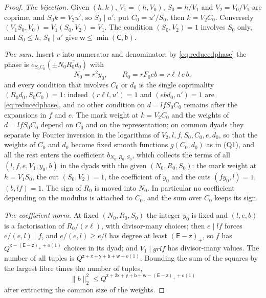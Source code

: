 \documentclass[11pt,colorlinks]{charlie}
\begin{document}
\begin{proof}
\emph{The bijection.} Given $(h,k)$, $V_1=(h,V_0)$, $S_0=h/V_1$ and $V_2=V_0/V_1$ are coprime, and $S_0k=V_2u'$, so $S_0\mid u'$; put $C_0=u'/S_0$, then $k=V_2C_0$. Conversely $(V_1S_0,V_0)=V_1(S_0,V_2)=V_1$. The condition $(S_0,V_2)=1$ involves $S_0$ only, and $S_0\le h$, $S_0\mid u'$ give $\mathsf w\le\min(\mathsf C,\mathfrak b)$.

\emph{The sum.} Insert $r$ into numerator and denominator: by \eqref{eq:reducedphase} the phase is $e_{S_0C_0}(\pm N_0\overline{R_0d_0})$ with
\[
 N_0=r^2y_0,\qquad R_0=rF_0eb=r\ell\,l\,e\,b,
\]
and every condition that involves $C_0$ or $d_0$ is the single coprimality $(R_0d_0,S_0C_0)=1$: indeed $(r\ell l,u')=1$ and $(ebd_0,u')=1$ are \eqref{eq:reducedphase}, and no other condition on $d=lfS_0C_0$ remains after the expansions in $f$ and $e$. The mark weight at $k=V_2C_0$ and the weights of $d=lfS_0C_0$ depend on $C_0$ and on the representation; on common dyads they separate by Fourier inversion in the logarithms of $V_2,l,f,S_0,C_0,e,d_0$, so that the weights of $C_0$ and $d_0$ become fixed smooth functions $g(C_0,d_0)$ as in (Q1), and all the rest enters the coefficient $b_{N_0,R_0,S_0}$, which collects the terms of all $(l,f,e,V_1,y_0,b)$ in the dyads with the given $(N_0,R_0,S_0)$: the mark weight at $h=V_1S_0$, the cut $(S_0,V_2)=1$, the coefficient of $y_0$ and the cuts $(fy_0,l)=1$, $(b,lf)=1$. The sign of $R_0$ is moved into $N_0$. In particular no coefficient depending on the modulus is attached to $C_0$, and the sum over $C_0$ keeps its sign.

\emph{The coefficient norm.} At fixed $(N_0,R_0,S_0)$ the integer $y_0$ is fixed and $(l,e,b)$ is a factorisation of $R_0/(r\ell)$, with divisor-many choices; then $e\mid lf$ forces $e/(e,l)\mid f$, and $e/(e,l)\ge e/l$ has degree at least $(\mathsf E-\mathsf z)_+$, so $f$ has $Q^{\mathsf x-(\mathsf E-\mathsf z)_++o(1)}$ choices in its dyad; and $V_1\mid grlf$ has divisor-many values. The number of all tuples is $Q^{\mathsf z+\mathsf x+\mathsf y+\mathsf b+\mathsf w+o(1)}$. Bounding the sum of the squares by the largest fibre times the number of tuples,
\[
 \|b\|_2^2\le Q^{\mathsf z+2\mathsf x+\mathsf y+\mathsf b+\mathsf w-(\mathsf E-\mathsf z)_++o(1)}
\]
after extracting the common size of the weights.


\end{proof}
\end{document}
